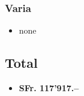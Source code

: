 \documentclass[12pt]{article}
\begin{document}
\subsubsection{Varia}
\begin{itemize}
	\item none
\end{itemize}

\subsection{Total}
\begin{itemize}
	\item {\bf \hfill SFr. 117'917.--}
\end{itemize}



\end{document}
